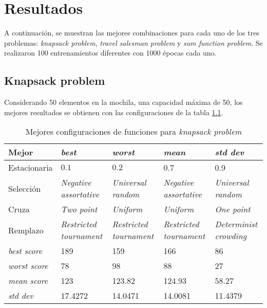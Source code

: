 \chapter{Resultados}

A continuación, se muestran las mejores combinaciones para cada uno de los tres problemas: \textit{knapsack problem}, \textit{travel salesman problem} y \textit{sum function problem}. Se realizaron 100 entrenamientos diferentes con 1000 épocas cada uno. 

\section{Knapsack problem}

Considerando 50 elementos en la mochila, una capacidad máxima de 50, los mejores resultados se obtienen con las configuraciones de la tabla \ref{tab:res_ksp}.

\begin{table}[h!]
	\centering
	\begin{tabular}{|p{}|p{}|p{}|p{}|p{}|}
		\hline
		\textbf{Mejor} & \textbf{\textit{best}} & \textbf{\textit{worst}} & \textbf{\textit{mean}} & \textbf{\textit{std dev}}  \\ \hline
		Estacionaria & $0.1$ & $0.2$ & 0.7 & 0.9 \\ 
		
		Selección & \textit{Negative assortative} & \textit{Universal random} & \textit{Negative assortative} & \textit{Universal random} \\
		
		Cruza & \textit{Two point} & \textit{Uniform} &  \textit{Uniform}& \textit{One point}\\
		
		Remplazo & \textit{Restricted tournament} & \textit{Restricted tournament} & \textit{Restricted tournament} & \textit{Determinist crowding}\\ \hline
		
		\textit{best score} & 189 & 159 & 166 & 86 \\
		
		\textit{worst score} & 78  & 98 & 88 & 27\\
		
		\textit{mean score} & 123 & 123.82& 124.93& 58.27 \\
		
		\textit{std dev} & 17.4272 & 14.0471 & 14.0081 & 11.4379  \\ \hline
		
	\end{tabular}
	\caption{Mejores configuraciones de funciones para \textit{knapsack problem}}
	\label{tab:res_ksp}
\end{table}

